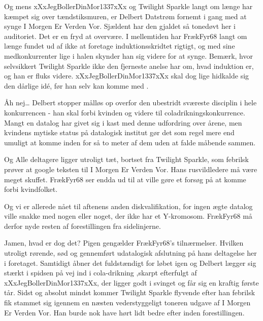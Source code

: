 \documentclass[a4paper,11pt]{article}
\begin{document}
\begin{sketch}


 Og mens xXxJegBollerDinMor1337xXx og Twilight Sparkle langt om længe har kæmpet sig over tændstiksmuren, er Delbert Datstrøm fornemt i gang med at synge I Morgen Er Verden Vor. Sjældent har den gjaldet så tonedøvt her i auditoriet. Det er en fryd at overvære. I mellemtiden har FrækFyr68 langt om længe fundet ud af ikke at foretage induktionsskridtet rigtigt, og med sine medkonkurrenter lige i halen skynder han sig videre for at synge. Bemærk, hvor selvsikkert Twilight Sparkle ikke den fjerneste anelse har om, hvad induktion er, og han er fluks videre. xXxJegBollerDinMor1337xXx skal dog lige hidkalde sig den dårlige idé, før han selv kan komme med .




 Åh nej… Delbert stopper målløs op overfor den ubestridt sværeste disciplin i hele konkurrencen - han skal forbi kvinden og videre til coladrikningskonkurrence. Mangt en datalog har givet sig i kast med denne udfordring over årene, men kvindens mytiske status på datalogisk institut gør det som regel mere end umuligt at komme inden for så to meter af dem uden at falde måbende sammen.




 Og Alle deltagere ligger utroligt tæt, bortset fra Twilight Sparkle, som febrilsk prøver at google teksten til I Morgen Er Verden Vor. Hans rusvildledere må være meget skuffet. FrækFyr68 ser endda ud til at ville gøre et forsøg på at komme forbi kvindfolket.




 Og vi er allerede nået til aftenens anden diskvalifikation, for ingen ægte datalog ville snakke med nogen eller noget, der ikke har et Y-kromosom. FrækFyr68 må derfor nyde resten af forestillingen fra sidelinjerne.




 Jamen, hvad er dog det? Pigen gengælder FrækFyr68’s tilnærmelser. Hvilken utroligt rørende, sød og gennemført udatalogisk afslutning på hans deltagelse her i foretaget. Samtidigt åbner det fuldstændigt for løbet igen og Delbert lægger sig stærkt i spidsen på vej ind i cola-drikning ,skarpt efterfulgt af xXxJegBollerDinMor1337xXx, der ligger godt i svinget og får sig en kraftig første tår. Sidst og absolut mindst kommer Twilight Sparkle flyvende efter han febrilsk fik stammet sig igennem en næsten vederstyggeligt toneren udgave af I Morgen Er Verden Vor. Han burde nok have hørt lidt bedre efter inden forestillingen.



\end{sketch}
\end{document}
